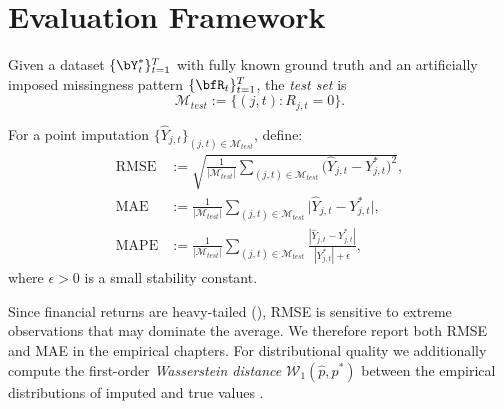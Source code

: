 \section{Evaluation Framework}
\label{sec:evaluation}

\begin{definition}
\label{def:test_set}
Given a dataset $\{\bY_t^*\}_{t=1}^T$ with fully known ground truth and an
artificially imposed missingness pattern $\{\bfR_t\}_{t=1}^T$, the
\emph{test set} is
\[
  \mathcal{M}_{test}
  := \bigl\{(j,t) : R_{j,t}=0\bigr\}.
\]
\end{definition}

\begin{definition}
\label{def:metrics}
For a point imputation $\{\hat{Y}_{j,t}\}_{(j,t)\in\mathcal{M}_{test}}$,
define:
\begin{align}
  \mathrm{RMSE}
  &:= \sqrt{\frac{1}{|\mathcal{M}_{test}|}
      \sum_{(j,t)\in\mathcal{M}_{test}}
      \!\!\bigl(\hat{Y}_{j,t} - Y_{j,t}^*\bigr)^2},
  \label{eq:rmse}\\[6pt]
  \mathrm{MAE}
  &:= \frac{1}{|\mathcal{M}_{test}|}
      \sum_{(j,t)\in\mathcal{M}_{test}}
      \!\!\bigl|\hat{Y}_{j,t} - Y_{j,t}^*\bigr|,
  \label{eq:mae}\\[6pt]
  \mathrm{MAPE}
  &:= \frac{1}{|\mathcal{M}_{test}|}
      \sum_{(j,t)\in\mathcal{M}_{test}}
      \frac{|\hat{Y}_{j,t} - Y_{j,t}^*|}{|Y_{j,t}^*|+\epsilon},
  \label{eq:mape}
\end{align}
where $\epsilon>0$ is a small stability constant.
\end{definition}

\begin{remark}
Since financial returns are heavy-tailed (), RMSE
is sensitive to extreme observations that may dominate the average.  We
therefore report both RMSE and MAE in the empirical chapters.  For
distributional quality we additionally compute the first-order
\emph{Wasserstein distance} $\mathcal{W}_1(\hat{p},p^*)$ between the
empirical distributions of imputed and true values \citep{wasserstein2021}.
\end{remark}


